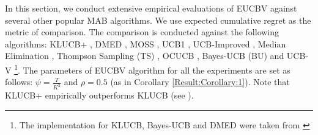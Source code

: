 In this section, we conduct extensive empirical evaluations of EUCBV against several other popular MAB  algorithms. We use expected cumulative regret as the metric of comparison. The comparison is conducted against the following algorithms: KLUCB+ \citep{garivier2011kl}, DMED \citep{honda2010asymptotically}, MOSS \citep{audibert2009minimax}, UCB1 \citep{auer2002finite}, UCB-Improved \citep{auer2010ucb}, Median Elimination \citep{even2006action}, Thompson Sampling (TS) \citep{agrawal2011analysis}, OCUCB \citep{lattimore2015optimally}, Bayes-UCB (BU) \citep{kaufmann2012bayesian} and UCB-V \citep{audibert2009exploration}\footnote{The implementation for KLUCB, Bayes-UCB and DMED were taken from \citet{CapGarKau12}}. The parameters of EUCBV algorithm for all the experiments are set as follows: $\psi=\frac{T}{K^2}$ and $\rho =0.5$ (as in Corollary \ref{Result:Corollary:1}). Note that KLUCB+ empirically outperforms KLUCB (see \citet{garivier2011kl}).

